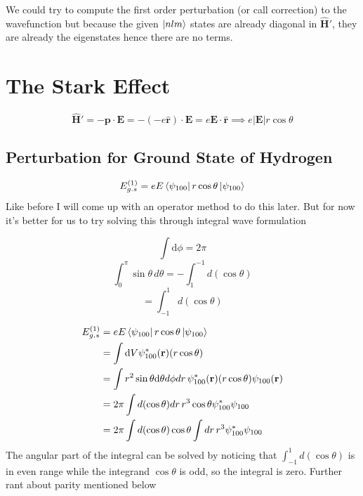 \documentclass[10pt]{article}
\renewcommand{\vec}{\mathbf}
\begin{document}
We could try to compute the first order perturbation (or call correction) to the wavefunction but because the given $\ket{nlm}$ states are already diagonal in $\hat{\vec{H}}'$, they are already the eigenstates hence there are no terms. 















\section*{The Stark Effect} 
\[
\hat{\vec{H}}' = - \vec{p} \cdot \vec{E} =  - \left(- e \hat{\vec{r}}\right)\cdot \vec{E} = e \vec{E} \cdot  \hat{\vec{r}} \implies e |\vec{E}| r \cos \theta
\]
\subsection*{Perturbation for Ground State of Hydrogen} 
\[
	E^{(1)}_{g.s} = e E \bra{\psi_{100}} r \cos \theta \ket{\psi_{100}}
\] 
Like before I will come up with an operator method to do this later. But for now it's better for us to try solving this through integral wave formulation 
\begin{margintable}
	\[
	\int \mathrm{d} \phi = 2 \pi
	\] 
	\[
		\int_{0}^{\pi} \sin \theta \, d \theta = - \int_{1}^{-1} d (\cos \theta)
	\] 
	\[
	= \int_{-1}^{1} d (\cos \theta) 
	\] 
\end{margintable}
\begin{align*}
	E^{(1)}_{g.s} &= e E \bra{\psi_{100}} r \cos \theta \ket{\psi_{100}} \\ 
		      &= \int \mathrm{d} V \psi^{*}_{100} (\vec{r}) (r \cos \theta)  \\
		      &= \int r^2 \sin \theta \mathrm{d} \theta d \phi d r\,  \psi^{*}_{100} (\vec{r}) (r \cos \theta) 
		      \psi_{100}(\vec{r}) \\ 
		      &= 2 \pi \int d(\cos \theta ) dr \, r^3 \cos \theta \psi_{100}^{*} \psi_{100} \\
		      &= 2 \pi \int d(\cos \theta ) \cos \theta  \int dr \, r^3 \psi_{100}^{*} \psi_{100} \\
\end{align*}
The angular part of the integral can be solved by noticing that $\int_{-1}^{1} d(\cos \theta) $ is in even range while the integrand $\cos \theta$ is odd, so the integral is zero. Further rant about parity mentioned below
\end{document}
